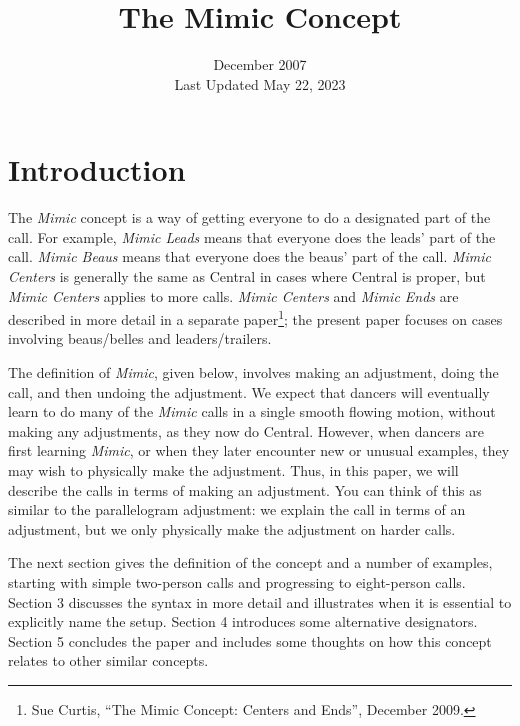 \documentclass[12pt]{article}
\begin{document}
\Largedancer

\title{The Mimic Concept}
\author{\hspace{1in}}
\date{December 2007 \\ Last Updated May 22, 2023}
\maketitle

\parskip 12pt
\section{Introduction}

The \emph{Mimic} concept is a way of getting everyone to do a designated
part of the call.
For example, \emph{Mimic Leads} means that everyone does the leads'
part of the call.
\emph{Mimic Beaus} means that everyone does the beaus' part of the call.
\emph{Mimic Centers} is generally the same as Central in cases where
Central is proper, but \emph{Mimic Centers} applies to more calls.
\emph{Mimic Centers} and \emph{Mimic Ends} are described in more detail
in a separate paper\footnote{Sue Curtis, ``The Mimic Concept: Centers and Ends'', December 2009.};
the present paper focuses on cases involving beaus/belles and leaders/trailers.

The definition of \emph{Mimic}, given below, involves making an adjustment,
doing the call, and then undoing the adjustment.
We expect that dancers will eventually learn to do many of the
\emph{Mimic} calls in a single smooth flowing motion, without
making any adjustments, as they now do Central.
However, when dancers are first learning \emph{Mimic}, or when they
later encounter new or unusual examples, they may wish to physically
make the adjustment.  Thus, in this paper, we will describe the
calls in terms of making an adjustment.
You can think of this as similar to the parallelogram adjustment:
we explain the call in terms of an adjustment, but we only physically
make the adjustment on harder calls.

The next section gives the definition of the concept
and a number of examples, starting with simple two-person
calls and progressing to eight-person calls.
Section 3 discusses the syntax in more detail and
illustrates when it is essential to explicitly name the setup.
Section 4 introduces some alternative designators.
Section 5 concludes the paper and includes some thoughts on how
this concept relates to other similar concepts.
\end{document}
